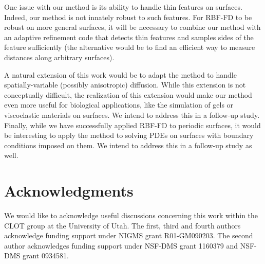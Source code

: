 \documentclass[smallextended]{svjour3}
\begin{document}
One issue with our method is its ability to handle thin features on surfaces. Indeed, our method is not innately robust to such features. For RBF-FD to be robust on more general surfaces, it will be necessary to combine our method with an adaptive refinement code that detects thin features and samples sides of the feature sufficiently (the alternative would be to find an efficient way to measure distances along arbitrary surfaces).

A natural extension of this work would be to adapt the method to handle spatially-variable (possibly anisotropic) diffusion. While this extension is not conceptually difficult, the realization of this extension would make our method even more useful for biological applications, like the simulation of gels or viscoelastic materials on surfaces. We intend to address this in a follow-up study. Finally, while we have successfully applied RBF-FD to periodic surfaces, it would be interesting to apply the method to solving PDEs on surfaces with boundary conditions imposed on them. We intend to address this in a follow-up study as well.


\section*{Acknowledgments}
We would like to acknowledge useful discussions concerning this work 
within the CLOT group at the University of Utah. The first, third and
fourth authors acknowledge funding support under NIGMS grant R01-GM090203.  
The second author acknowledges funding support under NSF-DMS grant 
1160379 and NSF-DMS grant 0934581.
 


\end{document}
